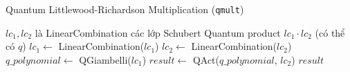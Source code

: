 \begin{algorithm}[H]
\caption{Quantum Littlewood-Richardson Multiplication (\texttt{qmult})}
\begin{algorithmic}[1]
\REQUIRE $lc_1, lc_2$ là LinearCombination các lớp Schubert
\ENSURE Quantum product $lc_1 \cdot lc_2$ (có thể có $q$)
\STATE $lc_1 \gets$ LinearCombination($lc_1$)
\STATE $lc_2 \gets$ LinearCombination($lc_2$)
\STATE $q\_polynomial \gets$ QGiambelli($lc_1$)
\STATE $result \gets$ QAct($q\_polynomial$, $lc_2$)
\RETURN $result$
\end{algorithmic}
\end{algorithm}